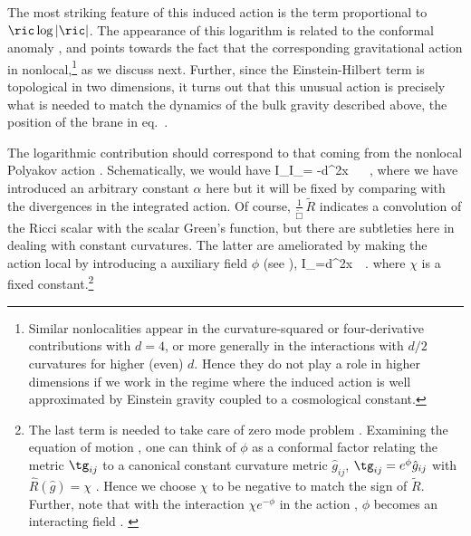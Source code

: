 The most striking feature of this induced action is the term proportional to $\ric\log|\ric|$. The appearance of this logarithm is related to the conformal anomaly \cite{Henningson:1998gx,Henningson:1998ey,Burgess:1999vb}, and points towards the fact that the corresponding gravitational action in nonlocal,\footnote{Similar nonlocalities appear in the curvature-squared or four-derivative contributions with $d=4$, or more generally in the interactions with $d/2$ curvatures for higher (even) $d$. Hence they do not play a role in higher dimensions if we work in the regime where the induced action  is well approximated by Einstein gravity coupled to a cosmological constant.} as we discuss next.  Further, since the Einstein-Hilbert term is topological in two dimensions, it turns out that this unusual action is precisely what is needed to match the dynamics of the bulk gravity described above, \ie the position of the brane in eq.~.

The logarithmic contribution  should correspond to that coming from the nonlocal Polyakov action \cite{Skenderis:1999nb}. Schematically, we would have
\beq
I_\simeq I_= -\int d^2x \, \,\, \,,
\label{induced-action3}
\eeq
where we have introduced an arbitrary constant $\alpha$ here but it will be fixed by comparing with the divergences in the integrated action. Of course, $\frac1{\tilde \Box}\,\tilde{R}$ indicates a convolution of the Ricci scalar with the scalar Green's function, but there are subtleties here in dealing with constant curvatures. The latter are ameliorated by making the action  local by introducing a auxiliary field $\phi$ (\eg see \cite{Skenderis:1999nb,Alvarez:1982zi}),
\beq
 I_=\int d^2x \,  \,.
\label{PolyAct2}
\eeq
where $\chi$ is a fixed constant.\footnote{The last term is needed to take care of zero mode problem \cite{Alvarez:1982zi}. Examining the equation of motion , one can think of $\phi$ as a conformal factor relating the metric $\tg_{ij}$ to a canonical constant curvature metric $\hat g_{ij}$, \ie $\tg_{ij}=e^{\phi}\hat g_{ij}$ with $\hat R(\hat g)=\chi$ \cite{Alvarez:1982zi,Frolov:1996hd}.
Hence we choose $\chi$ to be negative to match the sign of $\tilde R$. Further, note that with the interaction $\chi e^{-\phi}$ in the action , $\phi$ becomes an interacting field \cite{Skenderis:1999nb}.
\label{ZZZ}}

